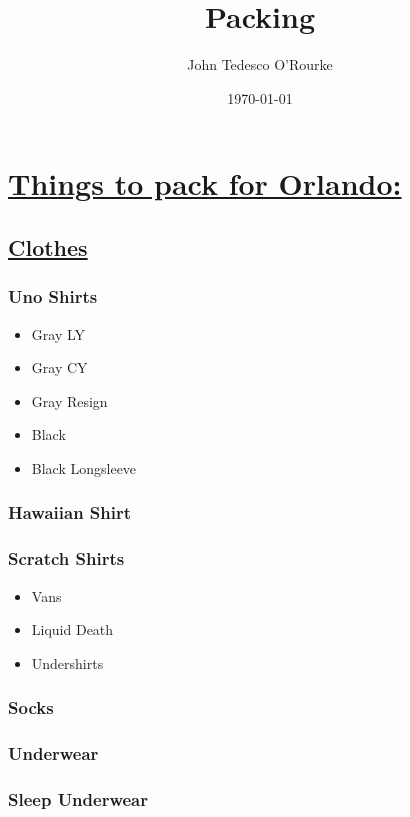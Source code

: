 \documentclass[11pt]{article}
\author{John Tedesco O'Rourke}
\date{\today}
\title{Packing}
\begin{document}
\maketitle
\section*{\underline{Things to pack for Orlando:}}
\label{sec:org25f71a9}
\subsection*{\underline{Clothes}}
\label{sec:orgf15cf0e}
\subsubsection*{Uno Shirts}
\label{sec:org404ce5c}
\begin{itemize}
\item[{$\square$}] Gray LY
\item[{$\square$}] Gray CY
\item[{$\square$}] Gray Resign
\item[{$\square$}] Black
\item[{$\square$}] Black Longsleeve
\end{itemize}
\subsubsection*{Hawaiian Shirt}
\label{sec:org2813ae0}
\subsubsection*{Scratch Shirts}
\label{sec:org41dda67}
\begin{itemize}
\item[{$\square$}] Vans
\item[{$\square$}] Liquid Death
\item[{$\square$}] Undershirts
\end{itemize}
\subsubsection*{Socks}
\label{sec:org94b8ac3}
\subsubsection*{Underwear}
\label{sec:org73208f0}
\subsubsection*{Sleep Underwear}
\label{sec:org647a7f8}
\end{document}
